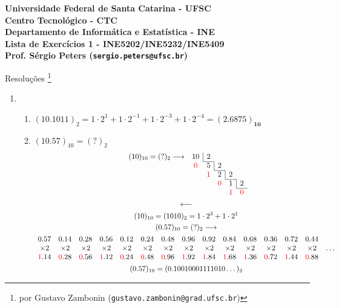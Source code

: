 \documentclass{article}
\newcommand\divr[1]{\multicolumn{1}{c|}{#1}}
\newcommand\redn[1]{\textcolor{red}{#1}}
\newenvironment{arabenum}{
    \begin{enumerate}[label=\textbf{\arabic*})]
}{
    \end{enumerate}
}
\newenvironment{alphenum}{
    \begin{enumerate}[label=(\alph*)]
}{
    \end{enumerate}
}
\begin{document}
{\bf \noindent Universidade Federal de Santa Catarina - UFSC \\
Centro Tecnológico - CTC \\
Departamento de Informática e Estatística - INE \\

\noindent Lista de Exercícios 1 - INE5202/INE5232/INE5409 \\
Prof. Sérgio Peters (\verb!sergio.peters@ufsc.br!)

\begin{center} Resoluções
\footnote{por Gustavo Zambonin (\texttt{gustavo.zambonin@grad.ufsc.br})}
\end{center}}

\begin{arabenum}

\item \begin{alphenum}

\item $(10.1011)_2 = 1 \cdot 2^1 + 1 \cdot 2^{-1} + 1 \cdot 2^{-3} +
1 \cdot 2^{-4} = \boldsymbol{(2.6875)_{10}}$

\item $(10.57)_{10} = (?)_2$
\begin{gather*}
\begin{array}{*{7}c}
(10)_{10} = (?)_2 \longrightarrow & \divr{10} & 2            \\ \cline{3-3}
                                  & \redn{0}  & \divr{5} & 2 \\ \cline{4-4}
&                                 & \redn{1}  & \divr{2} & 2 \\ \cline{5-5}
& &                               & \redn{0}  & \divr{1} & 2 \\ \cline{6-6}
& & &                             & \redn{1}  & \redn{0}
\end{array} \\
\longleftarrow \\
(10)_{10} = (1010)_2 = 1 \cdot 2^3 + 1 \cdot 2^1 \\
(0.57)_{10} = (?)_2 \longrightarrow \\
\begin{array}{*{15}c}
0.57 & 0.14 & 0.28 & 0.56 & 0.12 &
0.24 & 0.48 & 0.96 & 0.92 & 0.84 &
0.68 & 0.36 & 0.72 & 0.44 \\
\times 2 & \times 2 & \times 2 & \times 2 & \times 2 &
\times 2 & \times 2 & \times 2 & \times 2 & \times 2 &
\times 2 & \times 2 & \times 2 & \times 2 & \dots \\
\redn{1}.14 & \redn{0}.28 & \redn{0}.56 & \redn{1}.12 & \redn{0}.24 &
\redn{0}.48 & \redn{0}.96 & \redn{1}.92 & \redn{1}.84 & \redn{1}.68 &
\redn{1}.36 & \redn{0}.72 & \redn{1}.44 & \redn{0}.88
\end{array} \\
(0.57)_{10} = (0.10010001111010 \dots)_2
\end{gather*}


\end{alphenum}
\end{arabenum}
\end{document}
